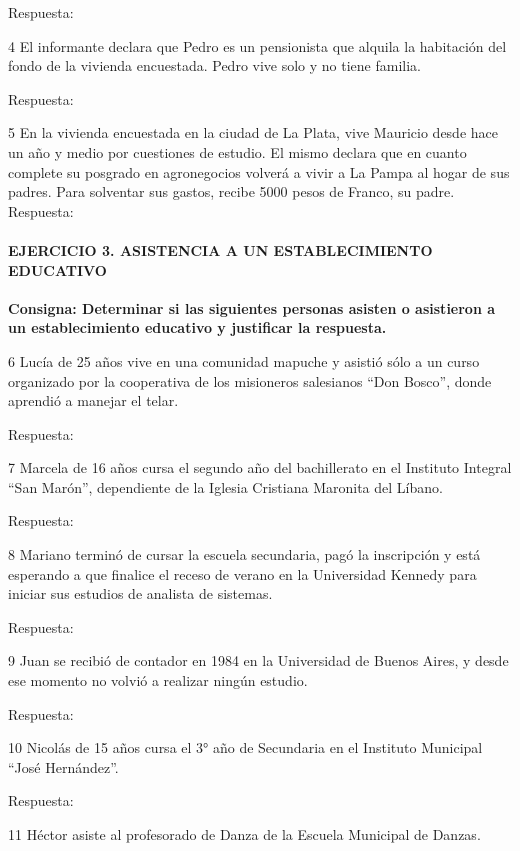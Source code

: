 \documentclass[
  openany]{book}
\begin{document}
Respuesta:

4 El informante declara que Pedro es un pensionista que alquila la habitación del fondo de la vivienda encuestada. Pedro vive solo y no tiene familia.

Respuesta:

5 En la vivienda encuestada en la ciudad de La Plata, vive Mauricio desde hace un año y medio por cuestiones de estudio. El mismo declara que en cuanto complete su posgrado en agronegocios volverá a vivir a La Pampa al hogar de sus padres. Para solventar sus gastos, recibe 5000 pesos de Franco, su padre. Respuesta:

\hypertarget{ejercicio-3.-asistencia-a-un-establecimiento-educativo}{%
\paragraph{\texorpdfstring{\textbf{EJERCICIO 3. ASISTENCIA A UN ESTABLECIMIENTO EDUCATIVO}}{EJERCICIO 3. ASISTENCIA A UN ESTABLECIMIENTO EDUCATIVO}}\label{ejercicio-3.-asistencia-a-un-establecimiento-educativo}}

\textbf{Consigna: Determinar si las siguientes personas asisten o asistieron a un establecimiento educativo y justificar la respuesta.}

6 Lucía de 25 años vive en una comunidad mapuche y asistió sólo a un curso organizado por la cooperativa de los misioneros salesianos ``Don Bosco'', donde aprendió a manejar el telar.

Respuesta:

7 Marcela de 16 años cursa el segundo año del bachillerato en el Instituto Integral ``San Marón'', dependiente de la Iglesia Cristiana Maronita del Líbano.

Respuesta:

8 Mariano terminó de cursar la escuela secundaria, pagó la inscripción y está esperando a que finalice el receso de verano en la Universidad Kennedy para iniciar sus estudios de analista de sistemas.

Respuesta:

9 Juan se recibió de contador en 1984 en la Universidad de Buenos Aires, y desde ese momento no volvió a realizar ningún estudio.

Respuesta:

10 Nicolás de 15 años cursa el 3° año de Secundaria en el Instituto Municipal ``José Hernández''.

Respuesta:

11 Héctor asiste al profesorado de Danza de la Escuela Municipal de Danzas.
\end{document}
